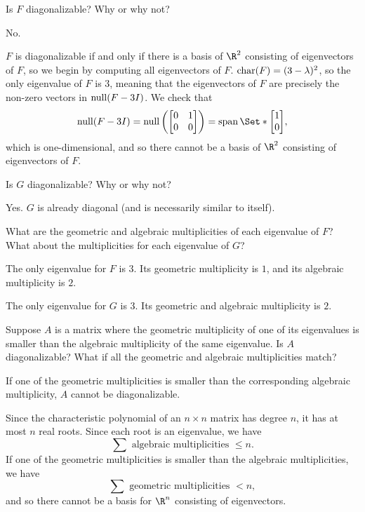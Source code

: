 \documentclass{problemset}
\begin{document}
	\begin{parts}
		\item Is $F$ diagonalizable?  Why or why not?
			\begin{solution}
				No.

				$F$ is diagonalizable if and only if there is a basis of $\R^2$
				consisting of eigenvectors of $F$, so we begin by computing all
				eigenvectors of $F$.
				$\operatorname{char}(F)=(3-\lambda)^2$, so the only eigenvalue of $F$ is $3$, 
				meaning that the eigenvectors of $F$ are precisely the non-zero
				vectors in $\operatorname{null}(F-3I)$. We check that 
				\[
					\Null(F-3I)
					=\Null\left(\mat{0&1\\0&0}\right)
					=\Span\Set*{\mat{1\\0}},
				\]
				which is one-dimensional, and so there cannot be a basis of $\R^2$
				consisting of eigenvectors of $F$. 
			\end{solution}
		\item Is $G$ diagonalizable?  Why or why not?
			\begin{solution}
				Yes. $G$ is already diagonal (and is necessarily similar to itself).
			\end{solution}
		\item What are the geometric and algebraic multiplicities of each eigenvalue
			of $F$? What about the multiplicities for each eigenvalue of $G$?
			\begin{solution}
				The only eigenvalue for $F$ is $3$. Its geometric multiplicity is $1$, 
				and its algebraic multiplicity is $2$. 
				
				The only eigenvalue for $G$ is $3$. Its geometric and algebraic multiplicity is $2$.
			\end{solution}
		\item Suppose $A$ is a matrix where the geometric multiplicity of one of its eigenvalues
			is smaller than the algebraic multiplicity of the same eigenvalue.  Is
			$A$ diagonalizable?  What if all the geometric and algebraic multiplicities
			match?
		\begin{solution}
				If one of the geometric multiplicities is smaller than the corresponding
				algebraic multiplicity, $A$ cannot be diagonalizable. 
				
				Since the characteristic polynomial of an $n\times n$ matrix has degree $n$,
				it has at most $n$ real roots. Since each root is an eigenvalue, we have
				\[
					\sum \text{ algebraic multiplicities }\leq n.
				\]
				If one of the geometric multiplicities is smaller than the algebraic multiplicities,
				we have
				\[
					\sum \text{ geometric multiplicities } < n,
				\]
				and so there cannot be a basis for $\R^n$ consisting of eigenvectors.


\end{solution}
\end{parts}
\end{document}

